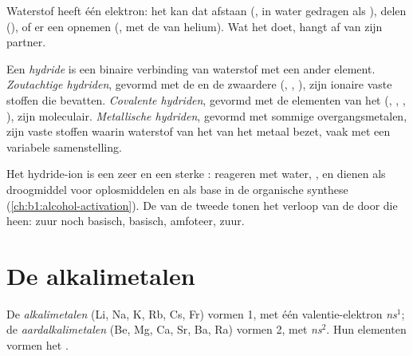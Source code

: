 Waterstof heeft één elektron: het kan dat afstaan (, in water
gedragen als ), delen (), of er een opnemen
(, met de  van helium). Wat het doet, hangt
af van zijn partner.

\begin{definition}[Hydriden]\label{def:b1:s-block:hydride}
Een \emph{hydride} is een binaire verbinding van waterstof
met een ander element. \emph{Zoutachtige hydriden},
gevormd met de  en de zwaardere 
(, , ), zijn ionaire vaste stoffen die 
bevatten. \emph{Covalente hydriden}, gevormd met
de elementen van het  (, , , ), zijn
moleculair. \emph{Metallische hydriden},
gevormd met sommige overgangsmetalen, zijn vaste stoffen waarin waterstof
 van het  van het metaal bezet, vaak met een
variabele samenstelling.
\end{definition}

Het hydride-ion is een zeer  en een sterke :
 reageren met water, , en
dienen als droogmiddel voor oplosmiddelen en als base in de organische
synthese (\cref{ch:b1:alcohol-activation}). De  van de
tweede  tonen het verloop van de  door die
 heen:  zuur noch basisch,  basisch, 
amfoteer,  zuur.

\section{De alkalimetalen}

\begin{definition}\label{def:b1:s-block:families}
De \emph{alkalimetalen} (Li, Na, K, Rb, Cs, Fr) vormen
 1, met één valentie-elektron \textit{ns}$^1$; de
\emph{aardalkalimetalen} (Be, Mg, Ca, Sr, Ba, Ra)
vormen  2, met \textit{ns}$^2$. Hun elementen vormen het .
\end{definition}

